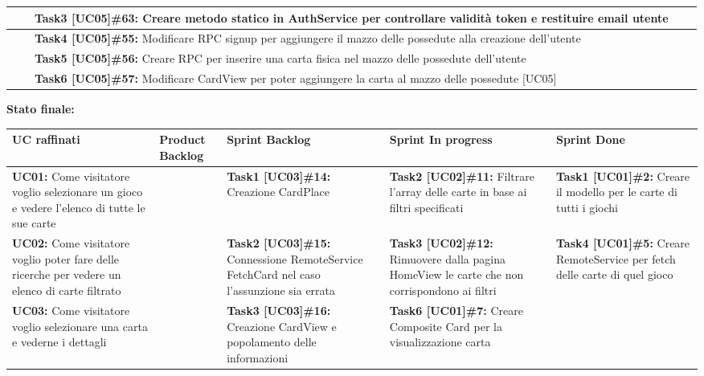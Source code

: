 \documentclass{article}
\begin{document}
\begin{itemize}
\begin{tabular}{ | p{3.5cm} | p{1.5cm} | p{5cm} | p{1.6cm} | p{1.6cm} | }
            \hline
            & & \textbf{Task3 [UC05]\#63:} Creare metodo statico in AuthService per controllare validità token e restituire email utente  & & \\
            \hline
            & & \textbf{Task4 [UC05]\#55:} Modificare RPC signup per aggiungere il mazzo delle possedute alla creazione dell'utente  & & \\
            \hline
            & & \textbf{Task5 [UC05]\#56:} Creare RPC per inserire una carta fisica nel mazzo delle possedute dell'utente  & & \\
            \hline
            & & \textbf{Task6 [UC05]\#57:} Modificare CardView per poter aggiungere la carta al mazzo delle possedute [UC05] #57 & & \\
            \hline
        \end{tabular}
        \newpage
        \textbf{Stato finale:}
        \newline
        \newline
        \begin{tabular}{ | p{2.4cm} | p{1.4cm} | p{2.7cm} | p{3.4cm} | p{3cm} | }
            \hline
            \textbf{UC raffinati}
            & \textbf{Product Backlog}
            & \textbf{Sprint Backlog}
            & \textbf{Sprint In progress}
            & \textbf{Sprint Done} \\
            \hline
            \textbf{UC01:} Come visitatore voglio selezionare un gioco e vedere l'elenco di tutte le sue carte
            & & \textbf{Task1 [UC03]\#14:} Creazione CardPlace
            & \textbf{Task2 [UC02]\#11:} Filtrare l'array delle carte in base ai filtri specificati
            & \textbf{Task1 [UC01]\#2:} Creare il modello per le carte di tutti i giochi \\
            \hline
            \textbf{UC02:} Come visitatore voglio poter fare delle ricerche per vedere un elenco di carte filtrato
            & & \textbf{Task2 [UC03]\#15:} Connessione RemoteService FetchCard nel caso l'assunzione sia errata
            & \textbf{Task3 [UC02]\#12:} Rimuovere dalla pagina HomeView le carte che non corrispondono ai filtri
            & \textbf{Task4 [UC01]\#5:} Creare RemoteService per fetch delle carte di quel gioco \\
            \hline
            \textbf{UC03:} Come visitatore voglio selezionare una carta e vederne i dettagli
            & & \textbf{Task3 [UC03]\#16:} Creazione CardView e popolamento delle informazioni
            & \textbf{Task6 [UC01]\#7:} Creare Composite Card per la visualizzazione carta

\end{tabular}
\end{itemize}
\end{document}
